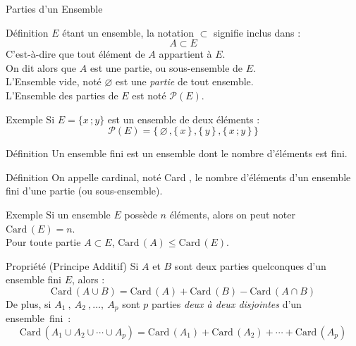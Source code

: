 \documentclass{coursbook}
\begin{document}
    \begin{Gpartie}{Parties d'un Ensemble}
        \begin{Spartie}{Définition}
            $E$ étant un ensemble, la notation $\subset$ signifie \og inclus dans \fg{} :
            \[A\subset E\]
            C'est-à-dire que tout élément de $A$ appartient à $E$. \\
            On dit alors que $A$ est une partie, ou sous-ensemble de $E$. \\
            L'Ensemble vide, noté $\varnothing$ est une \emph{partie} de tout ensemble. \\
            L'Ensemble des parties de $E$ est noté $\mathcal{P}(E)$.
            \begin{SSpartie}{Exemple}
                Si $E=\big\{x\,;y\big\}$ est un ensemble de deux éléments :
                \[\mathcal{P}(E)=\Big\{\,\varnothing\,, \big\{\, x\,\big\}\,, \big\{\, y\,\big\}\,, \big\{\,x\,; y\,\big\}\,\Big\}\]
            \end{SSpartie}
        \end{Spartie}
        \begin{Spartie}{Définition}
            Un ensemble fini est un ensemble dont le nombre d'éléments est fini.
        \end{Spartie}
        \begin{Spartie}{Définition}
            On appelle cardinal, noté \og Card \fg{}, le nombre d'éléments d'un ensemble fini d'une partie (ou sous-ensemble).
            \begin{SSpartie}{Exemple}
                Si un ensemble $E$ possède $n$ éléments, alors on peut noter $\mathrm{Card}\,(E)=n$. \\
                Pour toute partie $A\subset E$, $\mathrm{Card}\,(A)\leq\mathrm{Card}\,(E)$.
            \end{SSpartie}
        \end{Spartie}
        \begin{Spartie}{Propriété (Principe Additif)}
            Si $A$ et $B$ sont deux parties quelconques d'un ensemble fini $E$, alors :
            \[\mathrm{Card}\,(A\cup B)=\mathrm{Card}\,(A)+\mathrm{Card}\,(B)-\mathrm{Card}\,(A\cap B)\]
            De plus, si $A_1~,~A_2~,\dotsc,~A_p$ sont $p$ parties \emph{deux à deux disjointes} d'un ensemble~fini~:
            \[\mathrm{Card}\,\left(A_1\cup A_2\cup\dotsb\cup A_p\right)=\mathrm{Card}\,(A_1)+\mathrm{Card}\,(A_2)+\dotsb+\mathrm{Card}\,\left(A_p\right)\]
        \end{Spartie}

\end{Gpartie}
\end{document}
